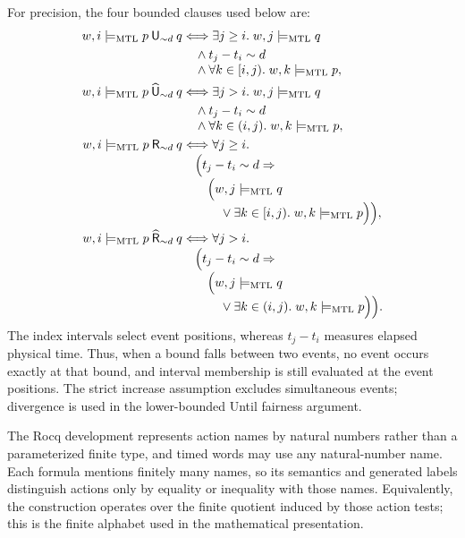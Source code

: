 \documentclass{ieeeaccess}
\newcommand{\satM}{\models_{\mathrm{MTL}}}
\newcommand{\Until}{\mathbin{\mathsf{U}}}
\newcommand{\Release}{\mathbin{\mathsf{R}}}
\newcommand{\hUntil}{\mathbin{\widehat{\mathsf{U}}}}
\newcommand{\hRelease}{\mathbin{\widehat{\mathsf{R}}}}
\begin{document}
For precision, the four bounded clauses used below are:
\begin{align*}
 w,i\satM p\Until_{\sim d}q
 &\Longleftrightarrow \exists j\ge i.\; w,j\satM q\\
 &\quad\land t_j-t_i\sim d\\[-1mm]
 &\quad\land \forall k\in[i,j).\;w,k\satM p,\\
 w,i\satM p\hUntil_{\sim d}q
 &\Longleftrightarrow \exists j>i.\; w,j\satM q\\
 &\quad\land t_j-t_i\sim d\\[-1mm]
 &\quad\land \forall k\in(i,j).\;w,k\satM p,\\
 w,i\satM p\Release_{\sim d}q
 &\Longleftrightarrow \forall j\ge i.\\[-1mm]
 &\quad\Bigl(t_j-t_i\sim d\Rightarrow\\[-1mm]
 &\qquad\Bigl(w,j\satM q\\[-1mm]
 &\qquad\quad\lor \exists k\in[i,j).\;w,k\satM p\Bigr)\Bigr),\\
 w,i\satM p\hRelease_{\sim d}q
 &\Longleftrightarrow \forall j>i.\\[-1mm]
 &\quad\Bigl(t_j-t_i\sim d\Rightarrow\\[-1mm]
 &\qquad\Bigl(w,j\satM q\\[-1mm]
 &\qquad\quad\lor \exists k\in(i,j).\;w,k\satM p\Bigr)\Bigr).
\end{align*}
The index intervals select event positions, whereas $t_j-t_i$ measures
elapsed physical time. Thus, when a bound falls between two events, no event
occurs exactly at that bound, and interval membership is still evaluated at
the event positions.
The strict increase assumption excludes simultaneous events; divergence is
used in the lower-bounded Until fairness argument.

The Rocq development represents action names by natural numbers rather than a
parameterized finite type, and timed words may use any natural-number name.
Each formula mentions finitely many names, so its semantics and generated
labels distinguish actions only by equality or inequality with those names.
Equivalently, the construction operates over the finite quotient induced by
those action tests; this is the finite alphabet used in the mathematical
presentation.
\end{document}
